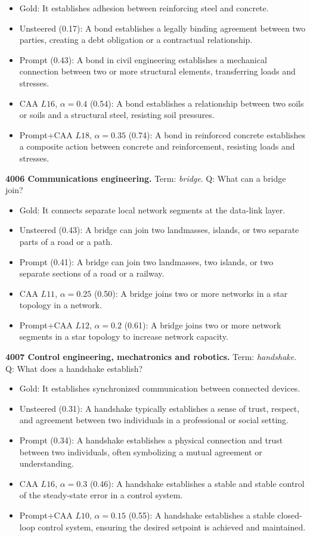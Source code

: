 \begin{itemize}\setlength{\itemsep}{0.15em}\setlength{\parsep}{0pt}\setlength{\topsep}{0.2em}
\item Gold: It establishes adhesion between reinforcing steel and concrete.
\item Unsteered (0.17): A bond establishes a legally binding agreement between two parties, creating a debt obligation or a contractual relationship.
\item Prompt (0.43): A bond in civil engineering establishes a mechanical connection between two or more structural elements, transferring loads and stresses.
\item CAA $L16$, $\alpha=0.4$ (0.54): A bond establishes a relationship between two soils or soils and a structural steel, resisting soil pressures.
\item Prompt+CAA $L18$, $\alpha=0.35$ (0.74): A bond in reinforced concrete establishes a composite action between concrete and reinforcement, resisting loads and stresses.
\end{itemize}
\medskip\noindent\textbf{4006 Communications engineering.} Term: \emph{bridge}.
Q: What can a bridge join?
\begin{itemize}\setlength{\itemsep}{0.15em}\setlength{\parsep}{0pt}\setlength{\topsep}{0.2em}
\item Gold: It connects separate local network segments at the data-link layer.
\item Unsteered (0.43): A bridge can join two landmasses, islands, or two separate parts of a road or a path.
\item Prompt (0.41): A bridge can join two landmasses, two islands, or two separate sections of a road or a railway.
\item CAA $L11$, $\alpha=0.25$ (0.50): A bridge joins two or more networks in a star topology in a network.
\item Prompt+CAA $L12$, $\alpha=0.2$ (0.61): A bridge joins two or more network segments in a star topology to increase network capacity.
\end{itemize}
\medskip\noindent\textbf{4007 Control engineering, mechatronics and robotics.} Term: \emph{handshake}.
Q: What does a handshake establish?
\begin{itemize}\setlength{\itemsep}{0.15em}\setlength{\parsep}{0pt}\setlength{\topsep}{0.2em}
\item Gold: It establishes synchronized communication between connected devices.
\item Unsteered (0.31): A handshake typically establishes a sense of trust, respect, and agreement between two individuals in a professional or social setting.
\item Prompt (0.34): A handshake establishes a physical connection and trust between two individuals, often symbolizing a mutual agreement or understanding.
\item CAA $L16$, $\alpha=0.3$ (0.46): A handshake establishes a stable and stable control of the steady-state error in a control system.
\item Prompt+CAA $L10$, $\alpha=0.15$ (0.55): A handshake establishes a stable closed-loop control system, ensuring the desired setpoint is achieved and maintained.
\end{itemize}
